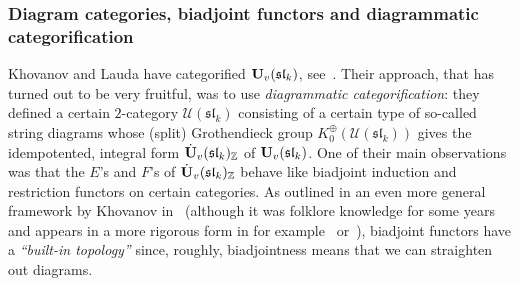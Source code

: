 \subsubsection{Diagram categories, biadjoint functors and diagrammatic categorification}\label{subsub-intropart4}








Khovanov and Lauda have categorified 
$\boldsymbol{\mathrm{U}}_v(\mathfrak{sl}_k)$, see~\cite{kl5}. 
Their approach, that has turned out to be very fruitful, was to 
use \textit{diagrammatic categorification}: 
they defined a certain $2$-category $\mathcal U(\mathfrak{sl}_k)$ 
consisting of a certain type of so-called string diagrams 
whose (split) Grothendieck group 
$K_0^{\oplus}(\mathcal U(\mathfrak{sl}_k))$ gives the idempotented, integral form $\dot{\boldsymbol{\mathrm{U}}}_v(\mathfrak{sl}_k)_{\mathbb{Z}}$ of $\boldsymbol{\mathrm{U}}_v(\mathfrak{sl}_k)$. One of 
their main observations was that the $E$'s and $F$'s of 
$\dot{\boldsymbol{\mathrm{U}}}_v(\mathfrak{sl}_k)_{\mathbb{Z}}$ behave like biadjoint 
induction and restriction functors on certain categories. 
As outlined in an even more general framework by Khovanov 
in~\cite{kh5} (although it was folklore knowledge for some 
years and appears in a more rigorous form in for 
example~\cite{js} or~\cite{mueg}), biadjoint functors 
have a \textit{``built-in topology''} since, roughly, 
biadjointness means that we can straighten out diagrams.


